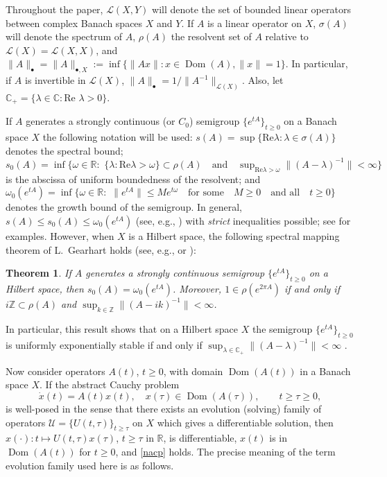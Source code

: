 \documentclass[10pt,psamsfonts,leqno]{siamltex}
\newtheorem{thm}[prop]{Theorem}
\newcommand{\bbR}{\mathbb{R}}
\newcommand{\bbZ}{\mathbb{Z}}
\newcommand{\Dom}{\operatorname{Dom}}
\newcommand{\lb}{\label}
\newcommand{\U}{\mathcal{U}}
\begin{document}
Throughout the paper, $\mathcal{L}(X,Y)$ will denote the set of bounded
linear operators between complex Banach spaces $X$ and $Y$.
If $A$ is a linear operator on $X$, $\sigma(A)$ will denote the
spectrum of $A$, $\rho(A)$ the
resolvent set of $A$ relative to $\mathcal{L}(X)=\mathcal{L}(X,X)$, and
$\| A \| _\bullet=\| A \|_{\bullet,X}:=
 \inf \{\| Ax \|: x\in \Dom(A),  \|x \| =1\}$.
In particular, if $A$ is invertible in $\mathcal{L}(X)$,
$\| A\|_\bullet = 1/ \|A^{-1}\|_{\mathcal{L}(X)}$.
Also, let ${\mathbb C}_+=\{\lambda\in{\mathbb C}:
\text{Re }\lambda>0\}$.

If $A$ generates a strongly continuous (or $C_0$) semigroup
$\{e^{tA}\}_{t\ge 0}$
on a Banach space $X$ the following notation will be used:
$s(A)=\sup\{\text{Re}\lambda: \lambda\in\sigma(A)\}$ denotes the
spectral bound; $s_0(A)=
\inf\{\omega\in{\mathbb R}:\,\,\{\lambda:\text{Re
}\lambda>\omega\}\subset\rho(A)\quad\text{and}\quad\sup_{\text{Re
}\lambda>\omega}\|(A-\lambda)^{-1}\|<\infty\}$ is the abscissa of
uniform
boundedness of the resolvent; and
$\omega_0(e^{tA})=\inf\{\omega\in{\mathbb R}:\,\,\|e^{tA}\|\le
Me^{t\omega}\quad\text{for some}\quad M\ge 0\quad\text{and all}\quad
t\ge
0\}$ denotes the growth bound of the semigroup. In general,
 $s(A)\le s_0(A)\le \omega_0(e^{tA})$ (see, e.g., \cite{vanNbook})
 with {\em strict} inequalities possible; see
\cite{Nagel,vanNbook,Renardy}
for examples.  However, when $X$ is a Hilbert space, the following
spectral
mapping theorem of L.~Gearhart holds (see, e.g., \cite[p.~95]{Nagel} or
\cite{vanNbook,Prus}):

\begin{thm}\label{GearTh} If $A$  generates a strongly continuous
semigroup
$\{e^{tA}\}_{t\ge0}$ on a Hilbert space, then $s_0(A)=
\omega_0(e^{tA})$. Moreover, $1\in \rho(e^{2\pi A})$ if and only if
$i\bbZ \subset\rho (A)$ and
$\sup_{k\in \bbZ} \| (A-ik)^{-1}\|< \infty$.
\end{thm}

\noindent In particular, this result shows that on a Hilbert space $X$
the semigroup $\{e^{tA}\}_{t\ge 0}$ is uniformly exponentially stable if
and
only if $\sup_{\lambda\in{\mathbb C}_+}\|(A-\lambda)^{-1}\|<\infty$
\cite{Huang}.

Now consider operators $A(t)$, $t\ge0$, with domain $\Dom(A(t))$
in a Banach space $X$. If the abstract Cauchy problem
\begin{equation}\lb{nacp}
\dot x(t)=A(t)x(t),\quad x(\tau)\in\Dom(A(\tau)),\qquad t\ge \tau \ge 0,
\end{equation}
is well-posed in the sense that there exists
an evolution (solving) family of operators $\U=\{U(t,\tau)\}_{t\ge
\tau}$ on $X$ which gives a differentiable solution, then
$x(\cdot):t\mapsto U(t,\tau)x(\tau)$,
$t\ge \tau$ in $\bbR$, is differentiable, $x(t)$ is in $\Dom(A(t))$ for
$t\ge0$, and \eqref{nacp} holds.  The precise meaning of the term
evolution family used here is as follows.
\end{document}
